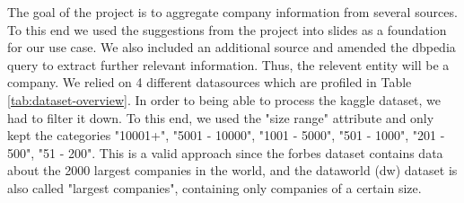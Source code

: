 \documentclass[11pt,titlepage,oneside,openany]{book}
\begin{document}
The goal of the project is to aggregate company information from several sources. To this end we used the suggestions from the project into slides as a foundation for our use case. We also included an additional source and amended the dbpedia query to extract further relevant information. Thus, the relevent entity will be a company.
We relied on 4 different datasources which are profiled in Table \ref{tab:dataset-overview}. In order to being able to process the kaggle dataset, we had to filter it down. To this end, we used the "size range" attribute and only kept the categories "10001+", "5001 - 10000", "1001 - 5000", "501 - 1000", "201 - 500", "51 - 200". This is a valid approach since the forbes dataset contains data about the 2000 largest companies in the world, and the dataworld (dw) dataset is also called "largest companies", containing only companies of a certain size.
\end{document}
